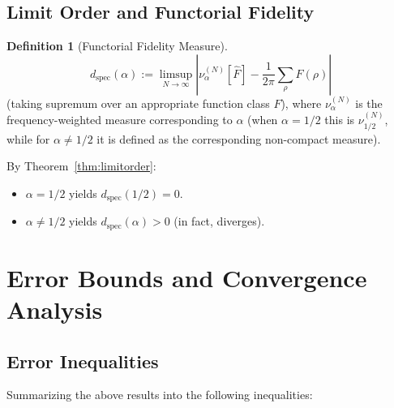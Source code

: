 \documentclass[12pt,a4paper]{amsart}
\theoremstyle{plain}
\theoremstyle{definition}
\newtheorem{definition}[theorem]{Definition}
\theoremstyle{remark}
\begin{document}
\subsection{Limit Order and Functorial Fidelity}

\begin{definition}[Functorial Fidelity Measure]\label{def:fidelity}
\[
d_{\mathrm{spec}}(\alpha) := \limsup_{N\to\infty} \left| \nu_\alpha^{(N)}[\widehat{F}] - \frac{1}{2\pi}\sum_{\rho}F(\rho) \right|
\]
(taking supremum over an appropriate function class $F$), where $\nu_\alpha^{(N)}$ is the frequency-weighted measure corresponding to $\alpha$ (when $\alpha=1/2$ this is $\nu_{1/2}^{(N)}$, while for $\alpha\neq1/2$ it is defined as the corresponding non-compact measure).
\end{definition}

By Theorem~\ref{thm:limitorder}:
\begin{itemize}
\item $\alpha=1/2$ yields $d_{\mathrm{spec}}(1/2)=0$.
\item $\alpha\neq1/2$ yields $d_{\mathrm{spec}}(\alpha) > 0$ (in fact, diverges).
\end{itemize}

\section{Error Bounds and Convergence Analysis}

\subsection{Error Inequalities}

Summarizing the above results into the following inequalities:
\end{document}
